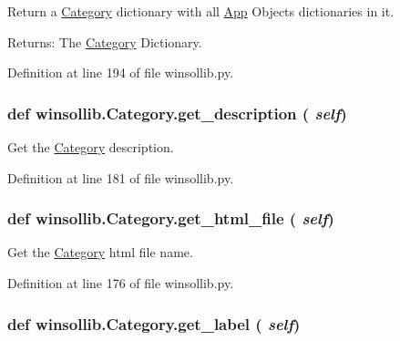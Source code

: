 Return a \hyperlink{classwinsollib_1_1Category}{Category} dictionary with all \hyperlink{classwinsollib_1_1App}{App} Objects dictionaries in it. 

\begin{Desc}
\item[Returns:]The \hyperlink{classwinsollib_1_1Category}{Category} Dictionary. \end{Desc}


Definition at line 194 of file winsollib.py.\hypertarget{classwinsollib_1_1Category_33630ec616e8ba009d82c8ad776d43e4}{
\subsubsection[get\_\-description]{\setlength{\rightskip}{0pt plus 5cm}def winsollib.Category.get\_\-description ( {\em self})}}
\label{classwinsollib_1_1Category_33630ec616e8ba009d82c8ad776d43e4}


Get the \hyperlink{classwinsollib_1_1Category}{Category} description. 



Definition at line 181 of file winsollib.py.\hypertarget{classwinsollib_1_1Category_126b7ddf27df79383e2ca4677106af52}{
\subsubsection[get\_\-html\_\-file]{\setlength{\rightskip}{0pt plus 5cm}def winsollib.Category.get\_\-html\_\-file ( {\em self})}}
\label{classwinsollib_1_1Category_126b7ddf27df79383e2ca4677106af52}


Get the \hyperlink{classwinsollib_1_1Category}{Category} html file name. 



Definition at line 176 of file winsollib.py.\hypertarget{classwinsollib_1_1Category_98f56ea31cc94280aab1b37f9c0fbc56}{
\subsubsection[get\_\-label]{\setlength{\rightskip}{0pt plus 5cm}def winsollib.Category.get\_\-label ( {\em self})}}
\label{classwinsollib_1_1Category_98f56ea31cc94280aab1b37f9c0fbc56}


